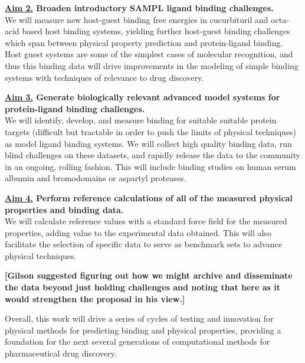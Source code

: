 \documentclass[11pt]{article}
\begin{document}
{\bf \underline{Aim 2.} Broaden introductory SAMPL ligand binding challenges.}\\
We will measure new host-guest binding free energies in cucurbituril and octa-acid based host binding systems, yielding further host-guest binding challenges which span between physical property prediction and protein-ligand binding. 
Host guest systems are some of the simplest cases of molecular recognition, and thus this binding data will drive improvements in the modeling of simple binding systems with techniques of relevance to drug discovery.

{\bf \underline{Aim 3.} Generate biologically relevant advanced model systems for protein-ligand binding challenges.}\\
We will identify, develop, and measure binding for suitable suitable protein targets (difficult but tractable in order to push the limits of physical techniques) as model ligand binding systems. We will collect high quality binding data, run blind challenges on these datasets, and rapidly release the data to the community in an ongoing, rolling fashion. This will include binding studies on human serum albumin and bromodomains or aspartyl proteases.

{\bf \underline{Aim 4.} Perform reference calculations of all of the measured physical properties and binding data.} \\
We will calculate reference values with a standard force field for the measured properties, adding value to the experimental data obtained.
This will also facilitate the selection of specific data to serve as benchmark sets to advance physical techniques.

{\bf [Gilson suggested figuring out how we might archive and disseminate the data beyond just holding challenges and noting that here as it would strengthen the proposal in his view.]}

Overall, this work will drive a series of cycles of testing and innovation for physical methods for predicting binding and physical properties, providing a foundation for the next several generations of computational methods for pharmaceutical drug discovery. 
\end{document}
